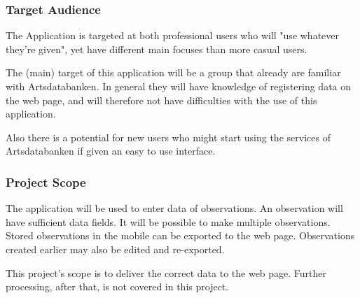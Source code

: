 \subsubsection{Target Audience}
	
The Application is targeted at both professional users who will "use whatever they're given",
yet have different main focuses than more casual users.

The (main) target of this application will be a group that already are familiar with Artsdatabanken.
In general they will have knowledge of registering data on the web page, and will therefore not
have difficulties with the use of this application.

Also there is a potential for new users who might start using the services of Artsdatabanken if
given an easy to use interface.


\subsubsection{Project Scope}
The application will be used to enter data of observations.
An observation will have sufficient data fields.
It will be possible to make multiple observations.
Stored observations in the mobile can be exported to the web page.
Observations created earlier may also be edited and re-exported.

This project's scope is to deliver the correct data to the web page.
Further processing, after that, is not covered in this project.
